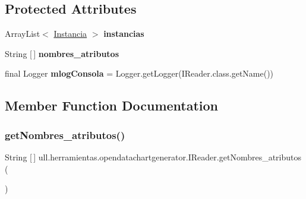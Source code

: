 \subsection*{Protected Attributes}
\begin{DoxyCompactItemize}
\item 
\mbox{\label{classull_1_1herramientas_1_1opendatachartgenerator_1_1_i_reader_a43d0ac954a6642eb70c65ac91f2ee49a}} 
Array\+List$<$ \mbox{\hyperlink{classull_1_1herramientas_1_1opendatachartgenerator_1_1_instancia}{Instancia}} $>$ {\bfseries instancias}
\item 
\mbox{\label{classull_1_1herramientas_1_1opendatachartgenerator_1_1_i_reader_af08f30649d8689518c0db66463110618}} 
String \mbox{[}$\,$\mbox{]} {\bfseries nombres\+\_\+atributos}
\item 
\mbox{\label{classull_1_1herramientas_1_1opendatachartgenerator_1_1_i_reader_a8d5486b73022565940486477a0e41f1e}} 
final Logger {\bfseries mlog\+Consola} = Logger.\+get\+Logger(I\+Reader.\+class.\+get\+Name())
\end{DoxyCompactItemize}


\subsection{Member Function Documentation}
\mbox{\label{classull_1_1herramientas_1_1opendatachartgenerator_1_1_i_reader_a2b9de98502df2fe23f2e96b680cd5c95}} 
\subsubsection{\texorpdfstring{get\+Nombres\+\_\+atributos()}{getNombres\_atributos()}}
{\footnotesize\ttfamily String \mbox{[}$\,$\mbox{]} ull.\+herramientas.\+opendatachartgenerator.\+I\+Reader.\+get\+Nombres\+\_\+atributos (\begin{DoxyParamCaption}{ }\end{DoxyParamCaption})}

